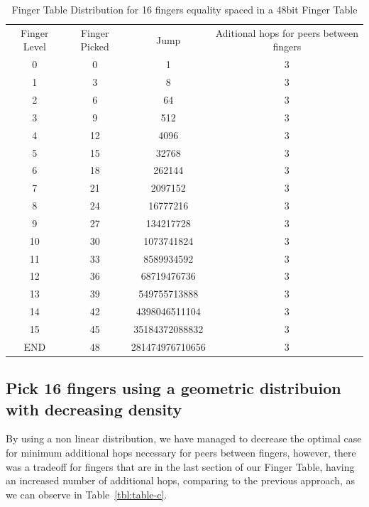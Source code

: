 \begin{table}
    \centering
    \begin{tabular}{| c | c | c | c |}
    \hline
        Finger Level &  Finger Picked & Jump & Aditional hops for peers between fingers \\
        0 & 0 & 1 & 3 \\
        1 & 3 & 8 & 3 \\
        2 & 6 & 64 & 3 \\
        3 & 9 & 512 & 3 \\
        4 & 12 & 4096 & 3 \\
        5 & 15 & 32768 & 3 \\
        6 & 18 & 262144 & 3 \\
        7 & 21 & 2097152 & 3 \\
        8 & 24 & 16777216 & 3 \\
        9 & 27 & 134217728 & 3 \\
        10 & 30 & 1073741824 & 3 \\
        11 & 33 & 8589934592 & 3 \\
        12 & 36 & 68719476736 & 3 \\
        13 & 39 & 549755713888 & 3 \\
        14 & 42 & 4398046511104 & 3 \\
        15 & 45 & 35184372088832 & 3 \\
        END & 48 & 281474976710656 & 3 \\
    \hline
    \end{tabular}
    \caption{Finger Table Distribution for 16 fingers equality spaced in a 48bit Finger Table}
    \label{tbl:table-b}
\end{table}

\subsection{Pick 16 fingers using a geometric distribuion with decreasing density}

By using a non linear distribution, we have managed to decrease the optimal case for minimum additional hops necessary for peers between fingers, however, there was a tradeoff for fingers that are in the last section of our Finger Table, having an increased number of additional hops, comparing to the previous approach, as we can observe in Table~\ref{tbl:table-c}.

